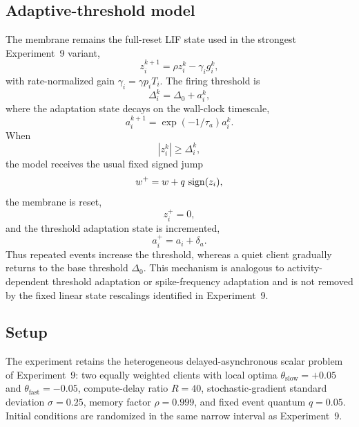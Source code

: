 \subsection{Adaptive-threshold model}

The membrane remains the full-reset LIF state used in the strongest Experiment~9 variant,
\begin{equation}
  z_i^{k+1}=\rho z_i^k-\gamma_i g_i^k,
\end{equation}
with rate-normalized gain $\gamma_i=\gamma p_iT_i$. The firing threshold is
\begin{equation}
  \Delta_i^k=\Delta_0+a_i^k,
\end{equation}
where the adaptation state decays on the wall-clock timescale,
\begin{equation}
  a_i^{k+1}=\exp(-1/\tau_a)a_i^k.
\end{equation}
When
\begin{equation}
  |z_i^k|\geq\Delta_i^k,
\end{equation}
the model receives the usual fixed signed jump
\begin{equation}
  w^+=w+q\,\operatorname{sign}(z_i),
\end{equation}
the membrane is reset,
\begin{equation}
  z_i^+=0,
\end{equation}
and the threshold adaptation state is incremented,
\begin{equation}
  a_i^+=a_i+\delta_a.
\end{equation}
Thus repeated events increase the threshold, whereas a quiet client gradually returns to the base threshold $\Delta_0$. This mechanism is analogous to activity-dependent threshold adaptation or spike-frequency adaptation and is not removed by the fixed linear state rescalings identified in Experiment~9.

\subsection{Setup}

The experiment retains the heterogeneous delayed-asynchronous scalar problem of Experiment~9: two equally weighted clients with local optima $\theta_{\mathrm{slow}}=+0.05$ and $\theta_{\mathrm{fast}}=-0.05$, compute-delay ratio $R=40$, stochastic-gradient standard deviation $\sigma=0.25$, memory factor $\rho=0.999$, and fixed event quantum $q=0.05$. Initial conditions are randomized in the same narrow interval as Experiment~9.

